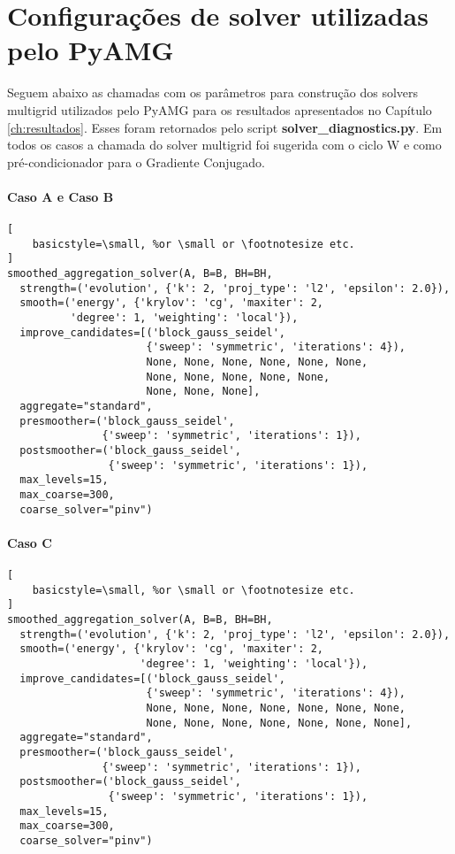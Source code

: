 \chapter{Configurações de solver utilizadas pelo PyAMG} \label{ch:pyamgSolver}


Seguem abaixo as chamadas com os parâmetros para construção dos solvers multigrid  utilizados pelo PyAMG para os resultados apresentados no Capítulo \ref{ch:resultados}. Esses foram retornados pelo script \textbf{solver\_diagnostics.py}. Em todos os casos a chamada do solver multigrid foi sugerida com o ciclo W e como pré-condicionador para o Gradiente Conjugado. 


\subsubsection{Caso A e Caso B}

\begin{lstlisting}[
    basicstyle=\small, %or \small or \footnotesize etc.
]
smoothed_aggregation_solver(A, B=B, BH=BH,
  strength=('evolution', {'k': 2, 'proj_type': 'l2', 'epsilon': 2.0}),
  smooth=('energy', {'krylov': 'cg', 'maxiter': 2, 
          'degree': 1, 'weighting': 'local'}),
  improve_candidates=[('block_gauss_seidel', 
                      {'sweep': 'symmetric', 'iterations': 4}), 
                      None, None, None, None, None, None,
                      None, None, None, None, None,
                      None, None, None],
  aggregate="standard",
  presmoother=('block_gauss_seidel', 
               {'sweep': 'symmetric', 'iterations': 1}),
  postsmoother=('block_gauss_seidel', 
                {'sweep': 'symmetric', 'iterations': 1}),
  max_levels=15,
  max_coarse=300,
  coarse_solver="pinv")
\end{lstlisting}

\subsubsection{Caso C}

\begin{lstlisting}[
    basicstyle=\small, %or \small or \footnotesize etc.
]
smoothed_aggregation_solver(A, B=B, BH=BH,
  strength=('evolution', {'k': 2, 'proj_type': 'l2', 'epsilon': 2.0}),
  smooth=('energy', {'krylov': 'cg', 'maxiter': 2, 
                     'degree': 1, 'weighting': 'local'}),
  improve_candidates=[('block_gauss_seidel', 
                      {'sweep': 'symmetric', 'iterations': 4}), 
                      None, None, None, None, None, None, None, 
                      None, None, None, None, None, None, None],
  aggregate="standard",
  presmoother=('block_gauss_seidel', 
               {'sweep': 'symmetric', 'iterations': 1}),
  postsmoother=('block_gauss_seidel', 
                {'sweep': 'symmetric', 'iterations': 1}),
  max_levels=15,
  max_coarse=300,
  coarse_solver="pinv")
\end{lstlisting}


